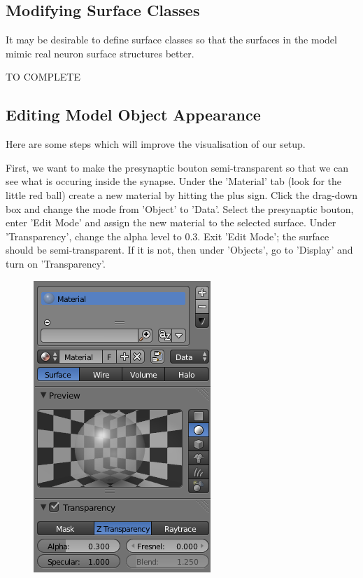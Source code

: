 \documentclass[twoside,a4paper]{refart}
\begin{document}
\subsection{Modifying Surface Classes}
It may be desirable to define surface classes so that the surfaces in the model mimic real neuron surface structures better. 

TO COMPLETE
    
\subsection{Editing Model Object Appearance} %
\label{sub:Editing Model Object Appearance}

Here are some steps which will improve the visualisation of our setup.

First, we want to make the presynaptic bouton semi-transparent so that we can see what is occuring inside the synapse. Under the 'Material' tab (look for the little red ball) create a new material by hitting the plus sign. Click the drag-down box and change the mode from 'Object' to 'Data'. Select the presynaptic bouton, enter 'Edit Mode' and assign the new material to the selected surface. Under 'Transparency', change the alpha level to 0.3. Exit 'Edit Mode'; the surface should be semi-transparent. If it is not, then under 'Objects', go to 'Display' and turn on 'Transparency'.

    \begin{figure}[H]
        \includegraphics[scale=0.5]{settings3.png}
    \end{figure}
\end{document}
